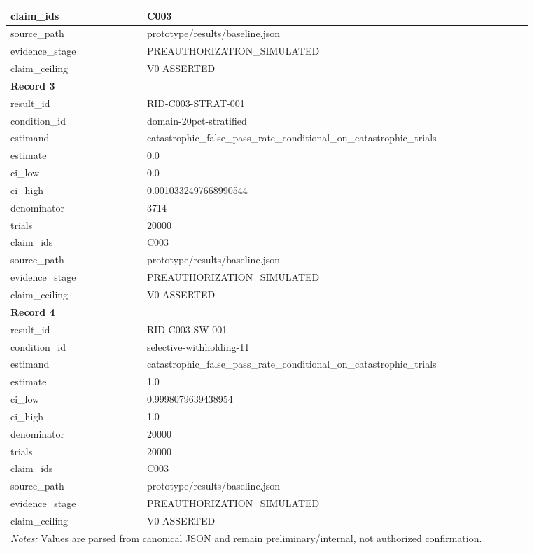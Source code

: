 \begin{longtable}{|p{0.24\linewidth}|p{0.68\linewidth}|}
claim\_\allowbreak{}ids & C003 \\ \hline
source\_\allowbreak{}path & prototype/results/baseline.json \\ \hline
evidence\_\allowbreak{}stage & PREAUTHORIZATION\_\allowbreak{}SIMULATED \\ \hline
claim\_\allowbreak{}ceiling & V0 ASSERTED \\ \hline
\multicolumn{2}{|l|}{\textbf{Record 3}} \\ \hline
result\_\allowbreak{}id & RID-C003-STRAT-001 \\ \hline
condition\_\allowbreak{}id & domain-20pct-stratified \\ \hline
estimand & catastrophic\_\allowbreak{}false\_\allowbreak{}pass\_\allowbreak{}rate\_\allowbreak{}conditional\_\allowbreak{}on\_\allowbreak{}catastrophic\_\allowbreak{}trials \\ \hline
estimate & 0.0 \\ \hline
ci\_\allowbreak{}low & 0.0 \\ \hline
ci\_\allowbreak{}high & 0.0010332497668990544 \\ \hline
denominator & 3714 \\ \hline
trials & 20000 \\ \hline
claim\_\allowbreak{}ids & C003 \\ \hline
source\_\allowbreak{}path & prototype/results/baseline.json \\ \hline
evidence\_\allowbreak{}stage & PREAUTHORIZATION\_\allowbreak{}SIMULATED \\ \hline
claim\_\allowbreak{}ceiling & V0 ASSERTED \\ \hline
\multicolumn{2}{|l|}{\textbf{Record 4}} \\ \hline
result\_\allowbreak{}id & RID-C003-SW-001 \\ \hline
condition\_\allowbreak{}id & selective-withholding-11 \\ \hline
estimand & catastrophic\_\allowbreak{}false\_\allowbreak{}pass\_\allowbreak{}rate\_\allowbreak{}conditional\_\allowbreak{}on\_\allowbreak{}catastrophic\_\allowbreak{}trials \\ \hline
estimate & 1.0 \\ \hline
ci\_\allowbreak{}low & 0.9998079639438954 \\ \hline
ci\_\allowbreak{}high & 1.0 \\ \hline
denominator & 20000 \\ \hline
trials & 20000 \\ \hline
claim\_\allowbreak{}ids & C003 \\ \hline
source\_\allowbreak{}path & prototype/results/baseline.json \\ \hline
evidence\_\allowbreak{}stage & PREAUTHORIZATION\_\allowbreak{}SIMULATED \\ \hline
claim\_\allowbreak{}ceiling & V0 ASSERTED \\ \hline
\multicolumn{2}{|p{0.92\linewidth}|}{\textit{Notes:} Values are parsed from canonical JSON and remain preliminary/internal, not authorized confirmation.} \\ \hline
\end{longtable}
\endgroup

